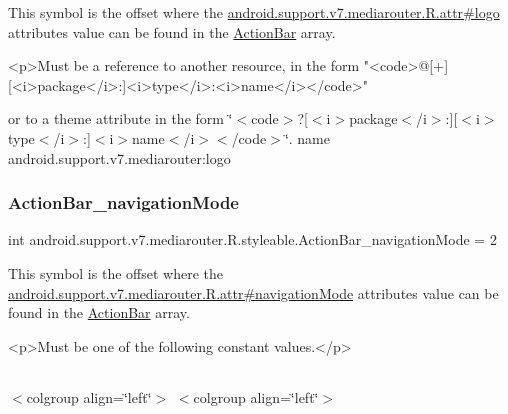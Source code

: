 This symbol is the offset where the \hyperlink{classandroid_1_1support_1_1v7_1_1mediarouter_1_1R_1_1attr_a822b5539967874c6df4234b52a556c30}{android.\+support.\+v7.\+mediarouter.\+R.\+attr\#logo} attribute\textquotesingle{}s value can be found in the \hyperlink{classandroid_1_1support_1_1v7_1_1mediarouter_1_1R_1_1styleable_adc4d3c0d096085367f12d025007aa53f}{Action\+Bar} array.

\begin{DoxyVerb}      <p>Must be a reference to another resource, in the form "<code>@[+][<i>package</i>:]<i>type</i>:<i>name</i></code>"
\end{DoxyVerb}
 or to a theme attribute in the form \char`\"{}$<$code$>$?\mbox{[}$<$i$>$package$<$/i$>$\+:\mbox{]}\mbox{[}$<$i$>$type$<$/i$>$\+:\mbox{]}$<$i$>$name$<$/i$>$$<$/code$>$\char`\"{}.  name android.\+support.\+v7.\+mediarouter\+:logo \mbox{\label{classandroid_1_1support_1_1v7_1_1mediarouter_1_1R_1_1styleable_a5499976bc56773a56860247e2573a497}} 
\subsubsection{\texorpdfstring{Action\+Bar\+\_\+navigation\+Mode}{ActionBar\_navigationMode}}
{\footnotesize\ttfamily int android.\+support.\+v7.\+mediarouter.\+R.\+styleable.\+Action\+Bar\+\_\+navigation\+Mode = 2\hspace{0.3cm}{\ttfamily [static]}}

This symbol is the offset where the \hyperlink{classandroid_1_1support_1_1v7_1_1mediarouter_1_1R_1_1attr_a44f0e044154a4084dcd2d30245a4e7be}{android.\+support.\+v7.\+mediarouter.\+R.\+attr\#navigation\+Mode} attribute\textquotesingle{}s value can be found in the \hyperlink{classandroid_1_1support_1_1v7_1_1mediarouter_1_1R_1_1styleable_adc4d3c0d096085367f12d025007aa53f}{Action\+Bar} array.

\begin{DoxyVerb}      <p>Must be one of the following constant values.</p>
\end{DoxyVerb}
 \tabulinesep=1mm
\begin{longtabu} spread 0pt [c]{*{0}{|X[-1]}|}
\hline
\end{longtabu}
$<$colgroup align=\char`\"{}left\char`\"{}$>$ $<$colgroup align=\char`\"{}left\char`\"{}$>$ 

